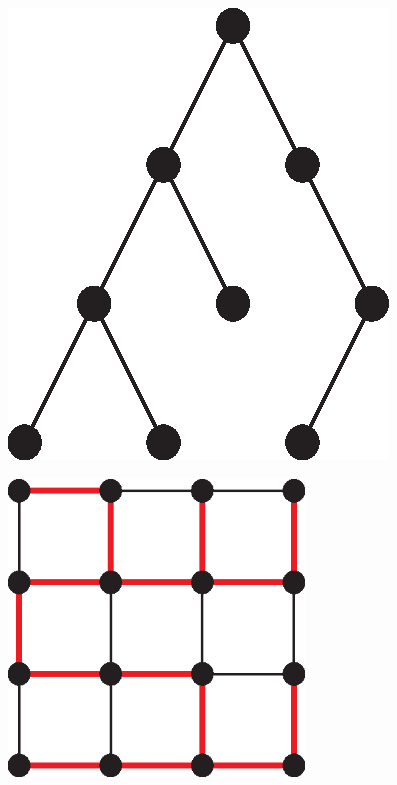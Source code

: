       \begin{figure}[H]
        \centering
        \begin{minipage}[b]{0.35\textwidth}
          \centering
          \includegraphics[width=\textwidth]{chapters/02_problem_definition/tree}
          \label{fig:path}
        \end{minipage}
        \qquad
        \begin{minipage}[b]{0.55\textwidth}
          \centering
          \includegraphics[width=0.7\textwidth]{chapters/02_problem_definition/tree_spanning}
          \label{fig:cycle}
        \end{minipage}
      \end{figure}
    
